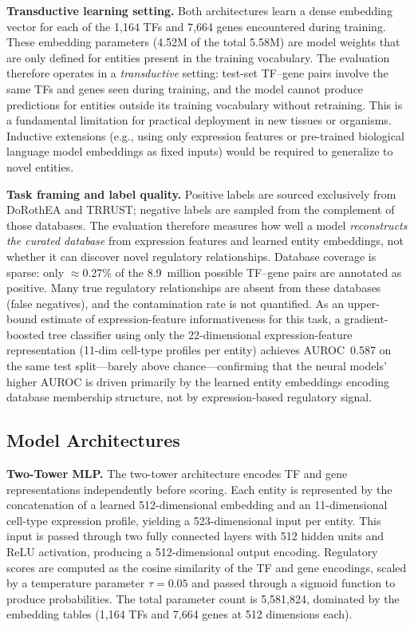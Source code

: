 \documentclass[journal]{IEEEtran}
\begin{document}
\textbf{Transductive learning setting.}
Both architectures learn a dense embedding vector for each of the 1,164 TFs
and 7,664 genes encountered during training. These embedding parameters
(4.52M of the total 5.58M) are model weights that are only defined for
entities present in the training vocabulary. The evaluation therefore
operates in a \emph{transductive} setting: test-set TF--gene pairs involve
the same TFs and genes seen during training, and the model cannot produce
predictions for entities outside its training vocabulary without retraining.
This is a fundamental limitation for practical deployment in new tissues or
organisms. Inductive extensions (e.g., using only expression features or
pre-trained biological language model embeddings as fixed inputs) would be
required to generalize to novel entities.

\textbf{Task framing and label quality.}
Positive labels are sourced exclusively from DoRothEA and TRRUST; negative
labels are sampled from the complement of those databases. The
evaluation therefore measures how well a model \emph{reconstructs the
curated database} from expression features and learned entity embeddings,
not whether it can discover novel regulatory relationships. Database coverage
is sparse: only $\approx$0.27\% of the 8.9~million possible TF--gene pairs
are annotated as positive. Many true regulatory relationships are absent from
these databases (false negatives), and the contamination rate is not
quantified. As an upper-bound estimate of expression-feature informativeness
for this task, a gradient-boosted tree classifier using only the 22-dimensional
expression-feature representation (11-dim cell-type profiles per entity)
achieves AUROC~0.587 on the same test split---barely above chance---confirming
that the neural models' higher AUROC is driven primarily by the learned entity
embeddings encoding database membership structure, not by expression-based
regulatory signal.

\subsection{Model Architectures}
\label{ssec:arch}

\textbf{Two-Tower MLP.} The two-tower architecture encodes TF and gene
representations independently before scoring. Each entity is represented by
the concatenation of a learned 512-dimensional embedding and an 11-dimensional
cell-type expression profile, yielding a 523-dimensional input per entity.
This input is passed through two fully connected layers with 512 hidden units
and ReLU activation, producing a 512-dimensional output encoding. Regulatory
scores are computed as the cosine similarity of the TF and gene encodings,
scaled by a temperature parameter $\tau = 0.05$ and passed through a sigmoid
function to produce probabilities. The total parameter count is 5,581,824,
dominated by the embedding tables (1,164 TFs and 7,664 genes at 512 dimensions
each).
\end{document}
